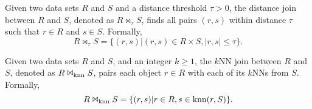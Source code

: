 \vspace{-7mm}
\begin{definition}
\label{def:disjoin}
Given two data sets $R$ and $S$ and a distance threshold $\tau> 0$, the
distance join between $R$ and $S$, denoted as $R \Join_{\tau} S$,
finds all pairs $(r, s)$ within distance $\tau$ such that $r\in R$ and
$s\in S$. Formally,
\[ R \Join_{\tau} S = \{(r, s)|(r, s) \in R \times S, |r, s| \le \tau\}. \]
\end{definition}

\vspace{-7mm}
\begin{definition}[$k$NN Join]
\label{def:knnjoin}
Given two data sets $R$ and $S$, and an integer $k\ge 1$, the $k$NN
join between $R$ and $S$, denoted as $R \Join_{\operatorname{knn}} S$, pairs each
object $r \in R$ with each of its $k$NNs from $S$. Formally,
\[ R \Join_{\operatorname{knn}} S = \{(r, s)|r \in R, s \in \operatorname{knn}(r, S)\}. \]
\end{definition}

